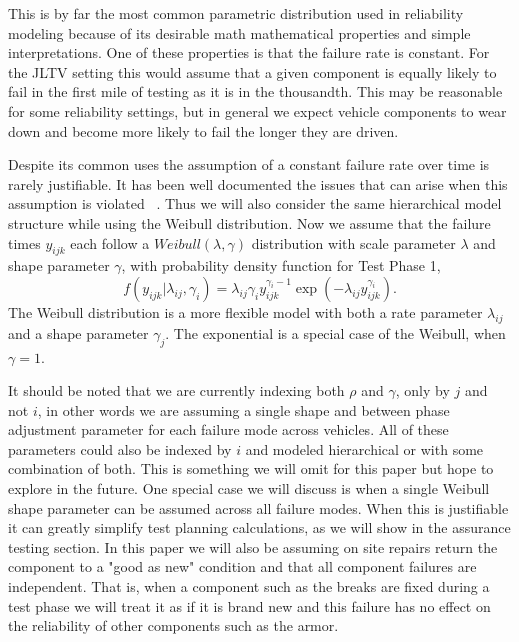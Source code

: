 \documentclass[12pt]{article}
\begin{document}
This is by far the most common parametric distribution used in reliability
modeling because of its desirable math mathematical properties and simple
interpretations.  One of these properties is that the failure rate is constant.
For the JLTV setting this would assume that a given component is equally likely
to fail in the first mile of testing as it is in the thousandth.  This may be
reasonable for some reliability settings, but in general we expect vehicle
components to wear down and become more likely to fail the longer they are
driven.

Despite its common uses the assumption of a constant failure rate over time is
rarely justifiable.  It has been well documented the issues that can arise when
this assumption is violated ~\cite{ref2}.  Thus we will also consider the same
hierarchical model structure while using the Weibull distribution.  Now we
assume that the failure times $y_{ijk}$ each follow a $Weibull(\lambda, \gamma)$
distribution with scale parameter $\lambda$ and shape parameter $\gamma$, with
probability density function for Test Phase 1,
\begin{equation}
f(y_{ijk}|\lambda_{ij},\gamma_{i})=\lambda_{ij}\gamma_{i}
y_{ijk}^{\gamma_{i}-1}\exp(-\lambda_{ij} y_{ijk}^{\gamma_{i}}).
\end{equation}
The Weibull distribution is a more flexible model with both a rate parameter
$\lambda_{ij}$ and a shape parameter $\gamma_{j}$.  The exponential is a special
case of the Weibull, when $\gamma = 1$.

It should be noted that we are currently indexing both $\rho$ and $\gamma$, only
by $j$ and not $i$, in other words we are assuming a single shape and between
phase adjustment parameter for each failure mode across vehicles.  All of these
parameters could also be indexed by $i$ and modeled hierarchical or with some
combination of both.  This is something we will omit for this paper but hope to
explore in the future.  One special case we will discuss is when a single
Weibull shape parameter can be assumed across all failure modes.  When this is
justifiable it can greatly simplify test planning calculations, as we will show
in the assurance testing section.  In this paper we will also be assuming on
site repairs return the component to a "good as new" condition and that all
component failures are independent.  That is, when a component such as the
breaks are fixed during a test phase we will treat it as if it is brand  new and
this failure has no effect on the reliability of other components such as the
armor.
\end{document}
